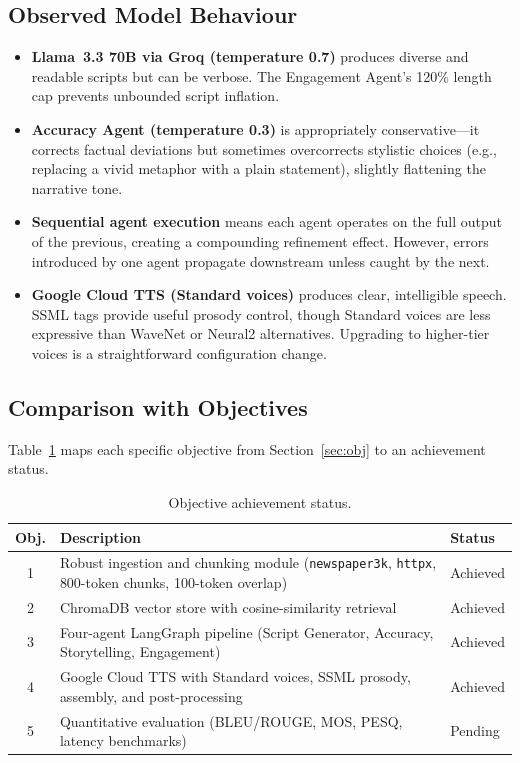\documentclass[sigconf,natbib=false]{acmart}   %
\begin{document}
\subsection{Observed Model Behaviour}

\begin{itemize}[nosep]
  \item \textbf{Llama~3.3 70B via Groq (temperature 0.7)} produces diverse and readable scripts but can be verbose.  The Engagement Agent's 120\% length cap prevents unbounded script inflation.
  \item \textbf{Accuracy Agent (temperature 0.3)} is appropriately conservative---it corrects factual deviations but sometimes overcorrects stylistic choices (e.g., replacing a vivid metaphor with a plain statement), slightly flattening the narrative tone.
  \item \textbf{Sequential agent execution} means each agent operates on the full output of the previous, creating a compounding refinement effect.  However, errors introduced by one agent propagate downstream unless caught by the next.
  \item \textbf{Google Cloud TTS (Standard voices)} produces clear, intelligible speech.  SSML tags provide useful prosody control, though Standard voices are less expressive than WaveNet or Neural2 alternatives.  Upgrading to higher-tier voices is a straightforward configuration change.
\end{itemize}

\subsection{Comparison with Objectives}
Table~\ref{tab:obj_status} maps each specific objective from Section~\ref{sec:obj} to an achievement status.

\begin{table}[H]
\centering
\small
\begin{tabular}{cp{7.5cm}l}
\toprule
\textbf{Obj.} & \textbf{Description} & \textbf{Status}\\
\midrule
1 & Robust ingestion and chunking module (\texttt{newspaper3k}, \texttt{httpx}, 800-token chunks, 100-token overlap) & Achieved\\
2 & ChromaDB vector store with cosine-similarity retrieval & Achieved\\
3 & Four-agent LangGraph pipeline (Script Generator, Accuracy, Storytelling, Engagement) & Achieved\\
4 & Google Cloud TTS with Standard voices, SSML prosody, assembly, and post-processing & Achieved\\
5 & Quantitative evaluation (BLEU/ROUGE, MOS, PESQ, latency benchmarks) & Pending\\
\bottomrule
\end{tabular}
\caption{Objective achievement status.}
\label{tab:obj_status}
\end{table}
\end{document}
